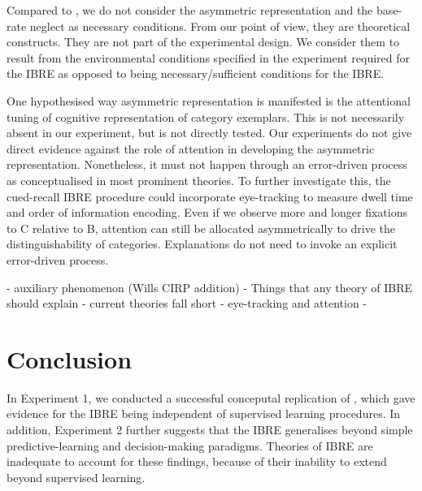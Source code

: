 \documentclass[10pt,letterpaper]{article}
\begin{document}
Compared to , we do not consider the asymmetric representation and the base-rate neglect as necessary conditions.
From our point of view, they are theoretical constructs.
They are not part of the experimental design.
We consider them to result from the environmental conditions specified in the experiment required for the IBRE as opposed to being necessary/sufficient conditions for the IBRE.

One hypothesised way asymmetric representation is manifested is the attentional tuning of cognitive representation of category exemplars.
This is not necessarily absent in our experiment, but is not directly tested.
Our experiments do not give direct evidence against the role of attention in developing the asymmetric representation.
Nonetheless, it must not happen through an error-driven process as conceptualised in most prominent theories.
To further investigate this, the cued-recall IBRE procedure could incorporate eye-tracking to measure dwell time and order of information encoding.
Even if we observe more and longer fixations to C relative to B, attention can still be allocated asymmetrically to drive the distinguishability of categories.
Explanations do not need to invoke an explicit error-driven process.


- auxiliary phenomenon (Wills CIRP addition)
- Things that any theory of IBRE should explain
- current theories fall short
- eye-tracking and attention
- 



\section{Conclusion}

In Experiment 1, we conducted a successful conceputal replication of , which gave evidence for the IBRE being independent of supervised learning procedures.
In addition, Experiment 2 further suggests that the IBRE generalises beyond simple predictive-learning \cite{kruschke1996base,don2021hearing} and decision-making \cite{johansen2007paradoxical} paradigms.
Theories of IBRE are inadequate to account for these findings, because of their inability to extend beyond supervised learning.
\end{document}
